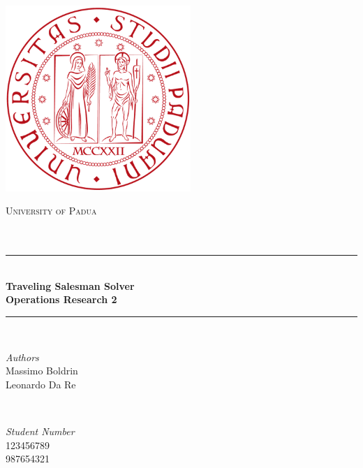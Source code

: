 \documentclass[a4paper]{report}
\begin{document}
\begin{titlepage} %
	\newcommand{\HRule}{\rule{\linewidth}{0.5mm}} %
	
	\center %
	
	\includegraphics[width=7cm]{img/unipd_logo.png}
	\bigskip
	
	\bigskip
	\textsc{\LARGE University of Padua}\\[1.5cm] %
	
	\textsc{\Large }\\[0.5cm] %
	
	\textsc{\large }\\[0.5cm] %
	
	
	\HRule\\[0.4cm]
	
	{\huge\bfseries Traveling Salesman Solver \\ Operations Research 2}\\[0.4cm] %
	
	\HRule\\[1.5cm]
	
	
	\begin{minipage}{0.4\textwidth}
		\begin{flushleft}
			\large
			\textit{Authors}\\
			Massimo Boldrin \\
            Leonardo Da Re
		\end{flushleft}
	\end{minipage}
	~
	\begin{minipage}{0.4\textwidth}
		\begin{flushright}
			\large
			\textit{Student Number}\\
			123456789 \\
            987654321
		\end{flushright}
	\end{minipage}
	

\end{titlepage}
\end{document}
